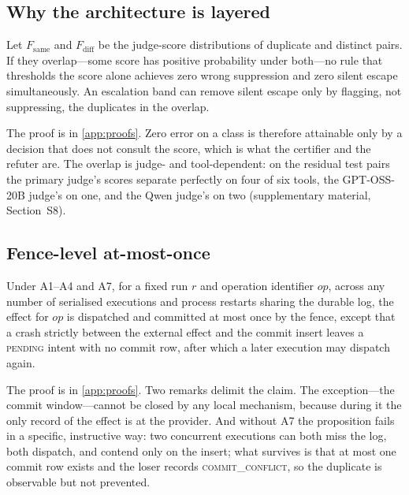 \subsection{Why the architecture is layered}

\begin{proposition}\label{prop:impossible}
Let $F_{\mathrm{same}}$ and $F_{\mathrm{diff}}$ be the judge-score distributions of duplicate and distinct pairs. If they overlap---some score has positive probability under both---no rule that thresholds the score alone achieves zero wrong suppression and zero silent escape simultaneously. An escalation band can remove silent escape only by flagging, not suppressing, the duplicates in the overlap.
\end{proposition}

The proof is in \ref{app:proofs}. Zero error on a class is therefore attainable only by a decision that does not consult the score, which is what the certifier and the refuter are. The overlap is judge- and tool-dependent: on the residual test pairs the primary judge's scores separate perfectly on four of six tools, the GPT-OSS-20B judge's on one, and the Qwen judge's on two (supplementary material, Section~S8).

\subsection{Fence-level at-most-once}\label{sec:amo}

\begin{proposition}\label{prop:amo}
Under A1--A4 and A7, for a fixed run $r$ and operation identifier $\mathit{op}$, across any number of serialised executions and process restarts sharing the durable log, the effect for $\mathit{op}$ is dispatched and committed at most once by the fence, except that a crash strictly between the external effect and the commit insert leaves a \textsc{pending} intent with no commit row, after which a later execution may dispatch again.
\end{proposition}

The proof is in \ref{app:proofs}. Two remarks delimit the claim. The exception---the commit window---cannot be closed by any local mechanism, because during it the only record of the effect is at the provider. And without A7 the proposition fails in a specific, instructive way: two concurrent executions can both miss the log, both dispatch, and contend only on the insert; what survives is that at most one commit row exists and the loser records \textsc{commit\_conflict}, so the duplicate is observable but not prevented.

